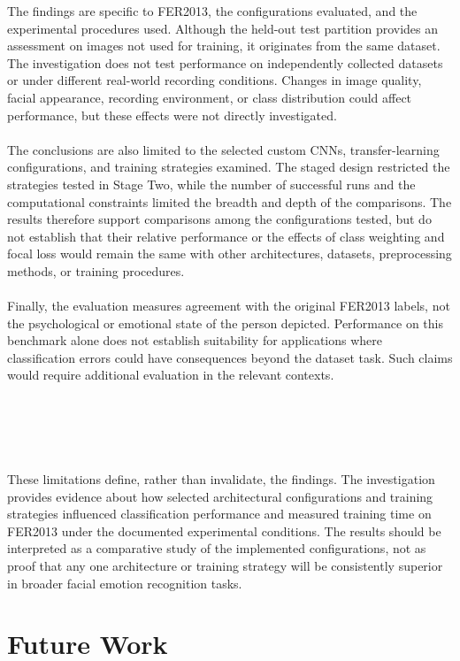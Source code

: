 \documentclass[12pt, a4paper]{report}
\begin{document}
			The findings are specific to FER2013, the configurations evaluated, and the experimental procedures used. Although the held-out test partition provides an assessment on images not used for training, it originates from the same dataset. The investigation does not test performance on independently collected datasets or under different real-world recording conditions. Changes in image quality, facial appearance, recording environment, or class distribution could affect performance, but these effects were not directly investigated.\\\\
			The conclusions are also limited to the selected custom CNNs, transfer-learning configurations, and training strategies examined. The staged design restricted the strategies tested in Stage Two, while the number of successful runs and the computational constraints limited the breadth and depth of the comparisons. The results therefore support comparisons among the configurations tested, but do not establish that their relative performance or the effects of class weighting and focal loss would remain the same with other architectures, datasets, preprocessing methods, or training procedures.\\\\
			Finally, the evaluation measures agreement with the original FER2013 labels, not the psychological or emotional state of the person depicted. Performance on this benchmark alone does not establish suitability for applications where classification errors could have consequences beyond the dataset task. Such claims would require additional evaluation in the relevant contexts.\\\\\\\\\\\\
			These limitations define, rather than invalidate, the findings. The investigation provides evidence about how selected architectural configurations and training strategies influenced classification performance and measured training time on FER2013 under the documented experimental conditions. The results should be interpreted as a comparative study of the implemented configurations, not as proof that any one architecture or training strategy will be consistently superior in broader facial emotion recognition tasks.
			

	\chapter{Future Work}
		
\end{document}
